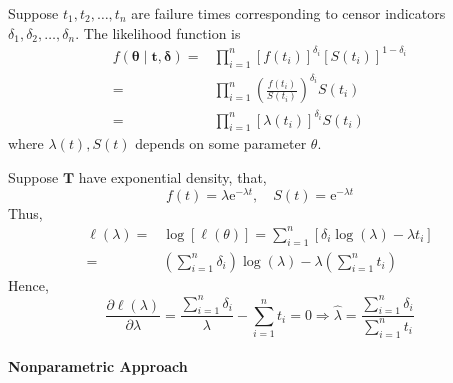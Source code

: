 Suppose \(t_{1},t_{2},\ldots,t_{n}\) are failure times corresponding to censor indicators \(\delta_{1},\delta_{2},\ldots,\delta_{n}\). The likelihood function is
\begin{equation}
	\begin{aligned}
		f\left(\boldsymbol{\theta}\mid\mathbf{t},\boldsymbol{\delta}\right)= & \prod_{i=1}^{n}\left[f\left(t_{i}\right)\right]^{\delta_{i}}\left[S\left(t_{i}\right)\right]^{1-\delta_{i}} \\
		=                                                                    & \prod_{i=1}^{n}\left(\frac{f\left(t_{i}\right)}{S\left(t_{i}\right)}\right)^{\delta_{i}}S\left(t_{i}\right) \\
		=                                                                    & \prod_{i=1}^{n}\left[\lambda\left(t_{i}\right)\right]^{\delta_{i}}S\left(t_{i}\right)
	\end{aligned}
\end{equation}
where \(\lambda(t),S(t)\) depends on some parameter \(\theta\).

\begin{example}
	Suppose \(\boldsymbol{T}\) have exponential density, that,
	\begin{equation*}
		f(t)=\lambda \mathrm{e}^{-\lambda t},\quad S(t)=\mathrm{e}^{-\lambda t}
	\end{equation*}
	Thus,
	\begin{equation*}
		\begin{aligned}
			\ell(\lambda)= & \log[\ell(\theta)]=\sum_{i=1}^{n}\left[\delta_{i}\log(\lambda)-\lambda t_{i}\right]        \\
			=              & \left(\sum_{i=1}^{n}\delta_{i}\right)\log(\lambda)-\lambda\left(\sum_{i=1}^{n}t_{i}\right)
		\end{aligned}
	\end{equation*}
	Hence,
	\begin{equation*}
		\frac{\partial\ell(\lambda)}{\partial\lambda}=\frac{\sum_{i=1}^{n}\delta_{i}}{\lambda}-\sum_{i=1}^{n}t_{i}=0\Rightarrow\hat{\lambda}=\frac{\sum_{i=1}^{n}\delta_{i}}{\sum_{i=1}^{n}t_{i}}
	\end{equation*}
\end{example}

\paragraph*{Nonparametric Approach}

